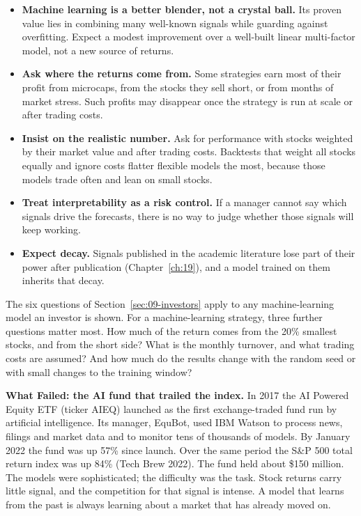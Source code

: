 \begin{itemize}
  \item \textbf{Machine learning is a better blender, not a crystal ball.} Its proven value lies in combining many well-known signals while guarding against overfitting. Expect a modest improvement over a well-built linear multi-factor model, not a new source of returns.
  \item \textbf{Ask where the returns come from.} Some strategies earn most of their profit from microcaps, from the stocks they sell short, or from months of market stress. Such profits may disappear once the strategy is run at scale or after trading costs.
  \item \textbf{Insist on the realistic number.} Ask for performance with stocks weighted by their market value and after trading costs. Backtests that weight all stocks equally and ignore costs flatter flexible models the most, because those models trade often and lean on small stocks.
  \item \textbf{Treat interpretability as a risk control.} If a manager cannot say which signals drive the forecasts, there is no way to judge whether those signals will keep working.
  \item \textbf{Expect decay.} Signals published in the academic literature lose part of their power after publication (Chapter~\ref{ch:19}), and a model trained on them inherits that decay.
\end{itemize}

The six questions of Section~\ref{sec:09-investors} apply to any machine-learning model an investor is shown. For a machine-learning strategy, three further questions matter most. How much of the return comes from the 20\% smallest stocks, and from the short side? What is the monthly turnover, and what trading costs are assumed? And how much do the results change with the random seed or with small changes to the training window?

\begin{callout}
\textbf{What Failed: the AI fund that trailed the index.} In 2017 the AI Powered Equity ETF (ticker AIEQ) launched as the first exchange-traded fund run by artificial intelligence. Its manager, EquBot, used IBM Watson to process news, filings and market data and to monitor tens of thousands of models. By January 2022 the fund was up 57\% since launch. Over the same period the S\&P 500 total return index was up 84\% (Tech Brew 2022). The fund held about \$150 million. The models were sophisticated; the difficulty was the task. Stock returns carry little signal, and the competition for that signal is intense. A model that learns from the past is always learning about a market that has already moved on.
\end{callout}

